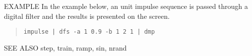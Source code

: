 \begin{options}
\end{options}

\begin{qsection}{EXAMPLE}
In the example below, an unit impulse sequence is passed through 
a digital filter and the results is presented on the screen.
\begin{quote}
 \verb!impulse | dfs -a 1 0.9 -b 1 2 1 | dmp!
\end{quote}
\end{qsection}

\begin{qsection}{SEE ALSO}
  step, train, ramp, sin, nrand
\end{qsection}
